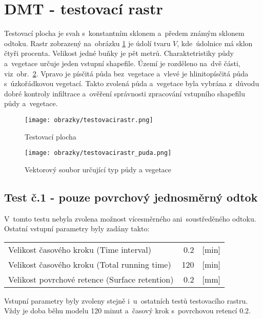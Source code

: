 \section{DMT - testovací rastr} \label{section:testovacirastr}
Testovací plocha je svah s~konstantním sklonem a~předem známým sklonem odtoku. Rastr zobrazený na~obrázku \ref{fig:testovacirastr} je údolí tvaru $V$, kde~údolnice má sklon čtyři procenta. Velikost jedné buňky je pět metrů.
Charaktetristiky půdy a~vegetace určuje jeden vstupní shapefile. Území je rozděleno na~dvě části, viz~obr.~\ref{fig:testovacirastrpuda}. Vpravo je písčitá půda bez~vegetace a~vlevé je hlinitopísčitá půda s~úzkořádkovou vegetací.
Takto zvolená půda a~vegetace byla vybrána z~důvodu dobré kontroly infiltrace a~ověření správnosti zpracování vstupního shapefilu půdy a~vegetace.
\newpage
\begin{figure}[hbt]
  \centering
  \texttt{[image: obrazky/testovacirastr.png]}
  \caption{Testovací plocha}
  \label{fig:testovacirastr}
\end{figure} \medskip
 
\begin{figure}[hbt]
  \centering
  \texttt{[image: obrazky/testovacirastr\_puda.png]}
  \caption{Vektorový soubor určující typ půdy a vegetace}
  \label{fig:testovacirastrpuda}
\end{figure} \medskip
\subsection{Test č.1 - pouze povrchový jednosměrný odtok} \label{subsection:test1testovni}
V~tomto testu nebyla zvolena možnost vícesměrného ani~soustředěného odtoku. Ostatní vstupní parametry byly zadány takto: \medskip

\begin{tabular}{ l  r l }
Velikost časového kroku (Time interval)  & 0.2 & [min] \\
Velikost časového kroku (Total running time)  & 120 & [min] \\
Velikost povrchové retence (Surface retention)  & 0.2 & [mm] \\
\end{tabular} \medskip
\par Vstupní parametry byly zvoleny stejně i~u~ostatních testů testovacího rastru. Vždy je doba běhu modelu 120 minut a~časový krok s~povrchovou retencí 0.2.
